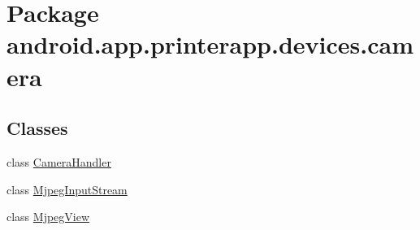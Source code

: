 \hypertarget{namespaceandroid_1_1app_1_1printerapp_1_1devices_1_1camera}{}\section{Package android.\+app.\+printerapp.\+devices.\+camera}
\label{namespaceandroid_1_1app_1_1printerapp_1_1devices_1_1camera}
\subsection*{Classes}
\begin{DoxyCompactItemize}
\item 
class \hyperlink{classandroid_1_1app_1_1printerapp_1_1devices_1_1camera_1_1_camera_handler}{Camera\+Handler}
\item 
class \hyperlink{classandroid_1_1app_1_1printerapp_1_1devices_1_1camera_1_1_mjpeg_input_stream}{Mjpeg\+Input\+Stream}
\item 
class \hyperlink{classandroid_1_1app_1_1printerapp_1_1devices_1_1camera_1_1_mjpeg_view}{Mjpeg\+View}
\end{DoxyCompactItemize}
